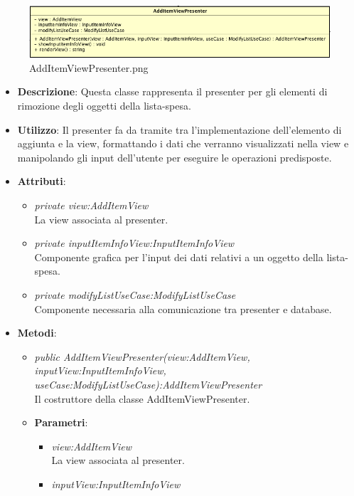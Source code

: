 \label{AddItemViewPresenter}
\begin{figure}[ht]
	\centering
	\includegraphics[scale=0.5]{Sezioni/SottosezioniST/img/app/AddItemViewPresenter.png}
	\caption{AddItemViewPresenter.png}
\end{figure}

\begin{itemize}
\item \textbf{Descrizione}: Questa classe rappresenta il presenter per gli elementi di rimozione degli oggetti  della lista-spesa.
\item \textbf{Utilizzo}: Il presenter fa da tramite tra l'implementazione dell'elemento di aggiunta e la view, formattando i dati che verranno visualizzati nella view e manipolando gli input dell'utente per eseguire le operazioni predisposte.
\item \textbf{Attributi}: 
	\begin{itemize}
	\item \textit{private view:AddItemView}\\
	La view associata al presenter.
	\item \textit{private inputItemInfoView:InputItemInfoView}\\
	Componente grafica per l'input dei dati relativi a un oggetto della lista-spesa.
	\item \textit{private modifyListUseCase:ModifyListUseCase}\\
	Componente necessaria alla comunicazione tra presenter e database.
	\end{itemize}
\item \textbf{Metodi}:
	\begin{itemize}
	\item \textit{public AddItemViewPresenter(view:AddItemView, inputView:InputItemInfoView, useCase:ModifyListUseCase):AddItemViewPresenter}\\
	Il costruttore della classe AddItemViewPresenter.	
		\item{\textbf{Parametri}: \begin{itemize}
		\item \textit{view:AddItemView}\\
			La view associata al presenter.
		\item \textit{inputView:InputItemInfoView}\\

\end{itemize}}
\end{itemize}
\end{itemize}
